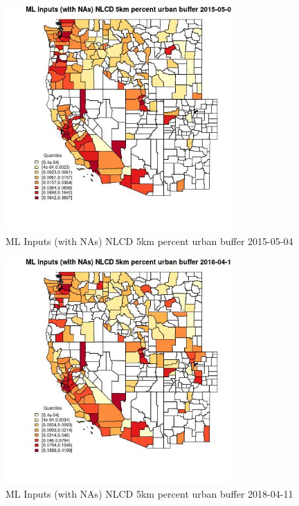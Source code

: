 \begin{figure} 
\centering  
\includegraphics[width=0.77\textwidth]{Code_Outputs/Report_ML_input_PM25_Step4_part_e_de_duplicated_aves_compiled_2019-05-18wNAs_CountyNLCD_5km_percent_urban_bufferMean2015-05-04_2015-05-04.jpg} 
\caption{\label{fig:Report_ML_input_PM25_Step4_part_e_de_duplicated_aves_compiled_2019-05-18wNAsCountyNLCD_5km_percent_urban_bufferMean2015-05-04_2015-05-04}ML Inputs (with NAs) NLCD 5km percent urban buffer 2015-05-04} 
\end{figure} 
 

\begin{figure} 
\centering  
\includegraphics[width=0.77\textwidth]{Code_Outputs/Report_ML_input_PM25_Step4_part_e_de_duplicated_aves_compiled_2019-05-18wNAs_CountyNLCD_5km_percent_urban_bufferMean2018-04-11_2018-04-11.jpg} 
\caption{\label{fig:Report_ML_input_PM25_Step4_part_e_de_duplicated_aves_compiled_2019-05-18wNAsCountyNLCD_5km_percent_urban_bufferMean2018-04-11_2018-04-11}ML Inputs (with NAs) NLCD 5km percent urban buffer 2018-04-11} 
\end{figure} 
 

